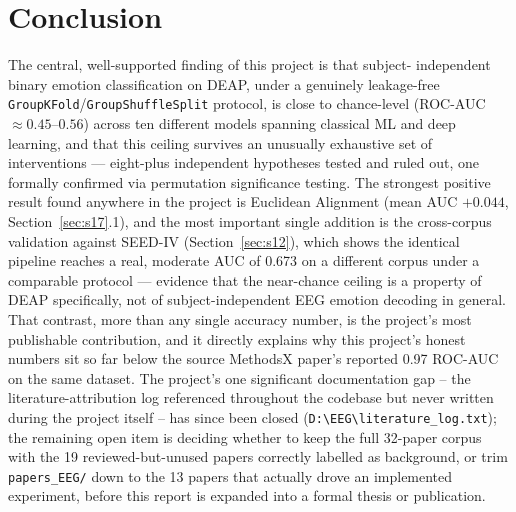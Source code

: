 \documentclass[11pt]{report}
\begin{document}
\chapter{Conclusion}
\label{ch:conclusion}

The central, well-supported finding of this project is that subject-
independent binary emotion classification on DEAP, under a genuinely
leakage-free \texttt{GroupKFold}/\texttt{GroupShuffleSplit} protocol, is
close to chance-level (ROC-AUC $\approx0.45$--$0.56$) across ten different
models spanning classical ML and deep learning, and that this ceiling
survives an unusually exhaustive set of interventions --- eight-plus
independent hypotheses tested and ruled out, one formally confirmed via
permutation significance testing. The strongest positive result found
anywhere in the project is Euclidean Alignment (mean AUC $+0.044$,
Section~\ref{sec:s17}.1), and the most important single addition is the
cross-corpus validation against SEED-IV (Section~\ref{sec:s12}), which shows
the identical pipeline reaches a real, moderate AUC of 0.673 on a different
corpus under a comparable protocol --- evidence that the near-chance ceiling
is a property of DEAP specifically, not of subject-independent EEG emotion
decoding in general. That contrast, more than any single accuracy number, is
the project's most publishable contribution, and it directly explains why
this project's honest numbers sit so far below the source MethodsX paper's
reported 0.97 ROC-AUC on the same dataset. The project's one significant
documentation gap -- the literature-attribution log referenced throughout
the codebase but never written during the project itself -- has since been
closed (\texttt{D:\textbackslash EEG\textbackslash literature\_log.txt}); the remaining open
item is deciding whether to keep the full 32-paper corpus with the 19
reviewed-but-unused papers correctly labelled as background, or trim
\texttt{papers\_EEG/} down to the 13 papers that actually drove an
implemented experiment, before this report is expanded into a formal
thesis or publication.
\end{document}
